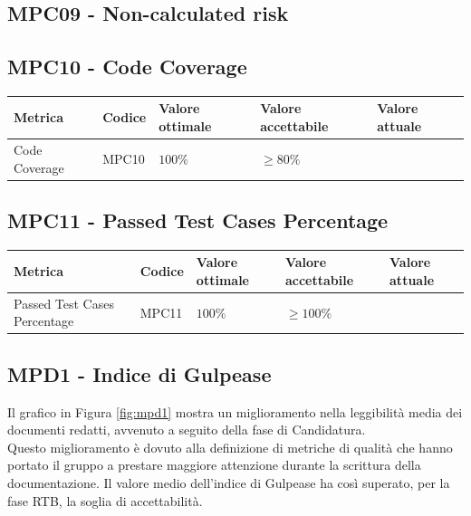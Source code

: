 \subsection{MPC09 - Non-calculated risk}
\label{s:mpc09}


\subsection{MPC10 - Code Coverage}
\label{s:mpc10}
\begin{table}[H]
    \centering
    \begin{tabularx}{\textwidth}{p{5.5cm}|X|l|l|l}
        \hline
        \textbf{Metrica} & \textbf{Codice} & \textbf{Valore ottimale} & \textbf{Valore accettabile} & \textbf{Valore attuale} \\
        \hline
        Code Coverage    & MPC10           & $100\%$                  & $\ge 80\%$                  &                         \\
    \end{tabularx}
\end{table}


\subsection{MPC11 - Passed Test Cases Percentage}
\label{s:mpc11}
\begin{table}[H]
    \centering
    \begin{tabularx}{\textwidth}{p{5.5cm}|X|l|l|l}
        \hline
        \textbf{Metrica}             & \textbf{Codice} & \textbf{Valore ottimale} & \textbf{Valore accettabile} & \textbf{Valore attuale} \\
        \hline
        Passed Test Cases Percentage & MPC11           & $100\%$                  & $\ge 100\%$                 &                         \\
    \end{tabularx}
\end{table}




\subsection{MPD1 - Indice di Gulpease}
\label{s:mpd1}
Il grafico in Figura \ref{fig:mpd1} mostra un miglioramento nella leggibilità media dei documenti redatti, avvenuto a seguito della fase di Candidatura.\\
Questo miglioramento è dovuto alla definizione di metriche di qualità che hanno portato il gruppo a prestare maggiore attenzione durante la scrittura della documentazione.
Il valore medio dell'indice di Gulpease ha così superato, per la fase RTB, la soglia di accettabilità.

